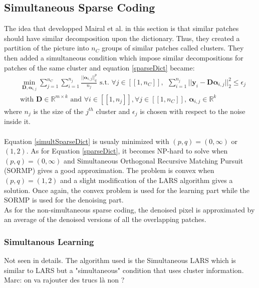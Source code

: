 \documentclass{ipol}
\newcommand{\psize}{m}
\newcommand{\dsize}{k}
\newcommand{\dict}{\textbf{D}}
\newcommand{\code}{\bm{\alpha}}
\newcommand{\pnorm}{p}
\newcommand{\qnorm}{q}
\newcommand{\nclust}{n_C}
\newcommand{\noi}{\textbf{y}}
\newcommand{\RR}{\mathbb{R}}
\begin{document}
\subsection{Simultaneous Sparse Coding}

The idea that developped Mairal et al. in this section is that similar patches should have similar decomposition upon the dictionary. Thus, they created a partition of the picture into $\nclust$ groups of similar patches called clusters. They then added a simultaneous condition which impose similar decompositions for patches of the same cluster and equation \eqref{sparseDict} became:
\begin{equation}
\begin{split}
	&\min_{\dict, \code_{i,j}} \sum_{j=1}^{\nclust} \sum_{i=1}^{n_j} \frac{||\code_{i,j}||^\pnorm_\qnorm}{n_j} \text{ s.t. } \forall j \in [\![1, \nclust]\!],\ \ \sum_{i=1}^{n_j}||\noi_i  - \dict \code_{i,j}||^2_2 \leqslant \epsilon_j \\
	& \text{with } \dict \in \RR^{\psize \times \dsize} \text{ and } \forall i \in [\![1,n_j]\!], \forall j \in [\![1, \nclust]\!], \ \code_{i,j} \in \RR^\dsize
	\label{simultSparseDict}
\end{split}
\end{equation}
where $n_j$ is the size of the $j^{th}$ cluster and $\epsilon_j$ is chosen with respect to the noise inside it.\\
\\
Equation \eqref{simultSparseDict} is usualy minimized with $(\pnorm, \qnorm) = (0, \infty)$ or $(1, 2)$. As for Equation \eqref{sparseDict}, it becomes NP-hard to solve when $(\pnorm, \qnorm)=(0, \infty)$ and Simultaneous Orthogonal Recursive Matching Pursuit (SORMP) \cite{SOMP} gives a good approximation. The problem is convex when $(\pnorm, \qnorm)=(1, 2)$ and a slight modification of the LARS algorithm gives a solution. Once again, the convex problem is used for the learning part while the SORMP is used for the denoising part.\\
As for the non-simultaneous sparse coding, the denoised pixel is approximated by an average of the denoised versions of all the overlapping patches.

\subsubsection{Simultanous Learning}

Not seen in details. The algorithm used is the Simultaneous LARS which is similar to LARS but a "simultaneous" condition that uses cluster information.
{\color{red} \\ Marc:  on va rajouter des trucs l\`a non ?}
\end{document}
